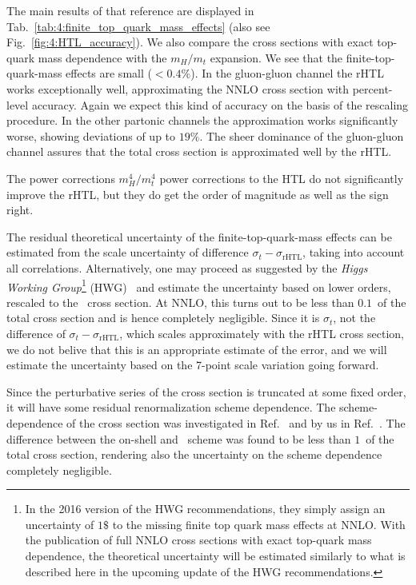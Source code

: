 The main results of that reference are displayed in Tab.~\ref{tab:4:finite_top_quark_mass_effects} (also see Fig.~\ref{fig:4:HTL_accuracy}). We also compare the cross sections with exact top-quark mass dependence with the $m_H/m_t$ expansion. We see that the finite-top-quark-mass effects are small ($<0.4\%$). In the gluon-gluon channel the \acs{rHTL} works exceptionally well, approximating the \acs{NNLO} cross section with percent-level accuracy. Again we expect this kind of accuracy on the basis of the rescaling procedure. In the other partonic channels the approximation works significantly worse, showing deviations of up to $19\%$. The sheer dominance of the gluon-gluon channel assures that the total cross section is approximated well by the \acs{rHTL}.

The power corrections $m_H^4/m_t^4$ power corrections to the \acs{HTL} do not significantly improve the \acs{rHTL}, but they do get the order of magnitude as well as the sign right.

The residual theoretical uncertainty of the finite-top-quark-mass effects can be estimated from the scale uncertainty of difference $\sigma_{t} - \sigma_{\mathrm{rHTL}}$, taking into account all correlations. Alternatively, one may proceed as suggested by the \textit{Higgs Working Group}\footnote{In the 2016 version of the HWG recommendations, they simply assign an uncertainty of $1\$$ to the missing finite top quark mass effects at \acs{NNLO}. With the publication of full \acs{NNLO} cross sections with exact top-quark mass dependence, the theoretical uncertainty will be estimated similarly to what is described here in the upcoming update of the HWG recommendations.} (HWG)~\cite{LHCHiggsCrossSectionWorkingGroup:2016ypw} and estimate the uncertainty based on lower orders, rescaled to the \NNNLO\ cross section. At \acs{NNLO}, this turns out to be less than $0.1$\textperthousand\ of the total cross section and is hence completely negligible. Since it is $\sigma_t$, not the difference of $\sigma_t - \sigma_{\mathrm{rHTL}}$, which scales approximately with the \acs{rHTL} cross section, we do not belive that this is an appropriate estimate of the error, and we will estimate the uncertainty based on the 7-point scale variation going forward.

Since the perturbative series of the cross section is truncated at some fixed order, it will have some residual renormalization scheme dependence. The scheme-dependence of the cross section was investigated in Ref.~\cite{Anastasiou:2016cez} and by us in Ref.~\cite{Czakon:2024ywb}. The difference between the on-shell and \MS\ scheme was found to be less than $1$\textperthousand\ of the total cross section, rendering also the uncertainty on the scheme dependence completely negligible.

